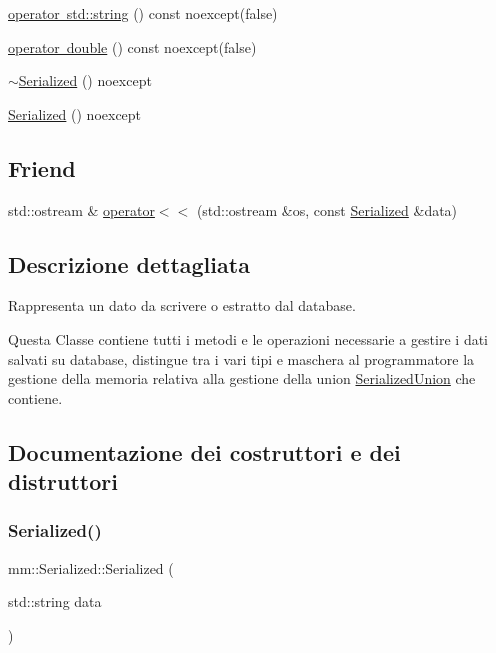 \begin{DoxyCompactItemize}
\item 
\mbox{\hyperlink{structmm_1_1_serialized_a4c753eedf42e36e51e8de52c2ae8917d}{operator std\+::string}} () const noexcept(false)
\item 
\mbox{\hyperlink{structmm_1_1_serialized_a3462f388a68a546a738038e5ce235b21}{operator double}} () const noexcept(false)
\item 
\mbox{\hyperlink{structmm_1_1_serialized_af1414a72ff10e038d96f6f33f352b2dc}{$\sim$\+Serialized}} () noexcept
\item 
\mbox{\hyperlink{structmm_1_1_serialized_a14f147b31fbf90a95379bbd919875362}{Serialized}} () noexcept
\end{DoxyCompactItemize}
\subsection*{Friend}
\begin{DoxyCompactItemize}
\item 
std\+::ostream \& \mbox{\hyperlink{structmm_1_1_serialized_a7ac660741c58dec6ffe85a006b9846ae}{operator$<$$<$}} (std\+::ostream \&os, const \mbox{\hyperlink{structmm_1_1_serialized}{Serialized}} \&data)
\end{DoxyCompactItemize}


\subsection{Descrizione dettagliata}
Rappresenta un dato da scrivere o estratto dal database. 

Questa Classe contiene tutti i metodi e le operazioni necessarie a gestire i dati salvati su database, distingue tra i vari tipi e maschera al programmatore la gestione della memoria relativa alla gestione della union \mbox{\hyperlink{unionmm_1_1_serialized_union}{Serialized\+Union}} che contiene. 

\subsection{Documentazione dei costruttori e dei distruttori}
\mbox{\label{structmm_1_1_serialized_a440d7e6daeb9e6c2ca286a2eee1fc24d}} 
\subsubsection{\texorpdfstring{Serialized()}{Serialized()}\hspace{0.1cm}{\footnotesize\ttfamily [1/7]}}
{\footnotesize\ttfamily mm\+::\+Serialized\+::\+Serialized (\begin{DoxyParamCaption}\item[{std\+::string}]{data }\end{DoxyParamCaption})\hspace{0.3cm}{\ttfamily [noexcept]}}

